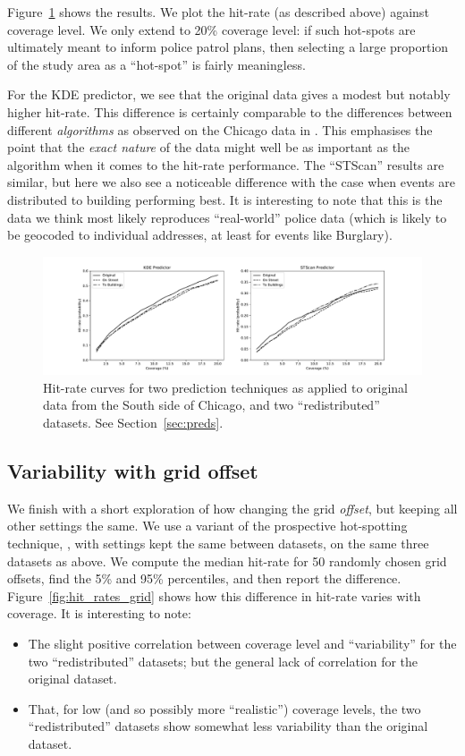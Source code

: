 \documentclass[twoside,a4paper,twocolumn,10pt]{article}
\theoremstyle{plain}
\theoremstyle{definition}
\begin{document}
Figure~\ref{fig:hit_rates} shows the results.  We plot the hit-rate (as described above) against
coverage level.  We only extend to 20\% coverage level: if such hot-spots are ultimately
meant to inform police patrol plans, then selecting a large proportion of the study area as a
``hot-spot'' is fairly meaningless.

For the KDE predictor, we see that the original data gives a modest but notably higher
hit-rate.  This difference is certainly comparable to the differences between different
\emph{algorithms} as observed on the Chicago data in \cite{arc}.  This emphasises the point
that the \emph{exact nature} of the data might well be as important as the algorithm when it
comes to the hit-rate performance.  The ``STScan'' results are similar, but here we also
see a noticeable difference with the case when events are distributed to building performing
best.  It is interesting to note that this is the data we think most likely reproduces
``real-world'' police data (which is likely to be geocoded to individual addresses, at least
for events like Burglary).

\begin{figure}
  \includegraphics[width=\textwidth]{hit_rates.pdf}
  \caption{Hit-rate curves for two prediction techniques as applied to original data from
  the South side of Chicago, and two ``redistributed'' datasets.  See Section~\ref{sec:preds}.}
  \label{fig:hit_rates}
\end{figure}


\subsection{Variability with grid offset}\label{sec:preds_grid}

We finish with a short exploration of how changing the grid \emph{offset}, but keeping all
other settings the same.  We use a variant of the prospective hot-spotting technique,
\cite{bjp}, with settings kept the same between datasets, on the same three datasets as above.
We compute the median hit-rate for 50 randomly chosen grid offsets, find the 5\% and 95\%
percentiles, and then report the difference.
Figure~\ref{fig:hit_rates_grid} shows how this difference in hit-rate
varies with coverage.  It is interesting to note:
\begin{itemize}
\item The slight positive correlation between coverage level and ``variability'' for
the two ``redistributed'' datasets; but the general lack of correlation for the original
dataset.
\item That, for low (and so possibly more ``realistic'') coverage levels, the two
``redistributed'' datasets show somewhat less variability than the original dataset.
\end{itemize}
\end{document}
